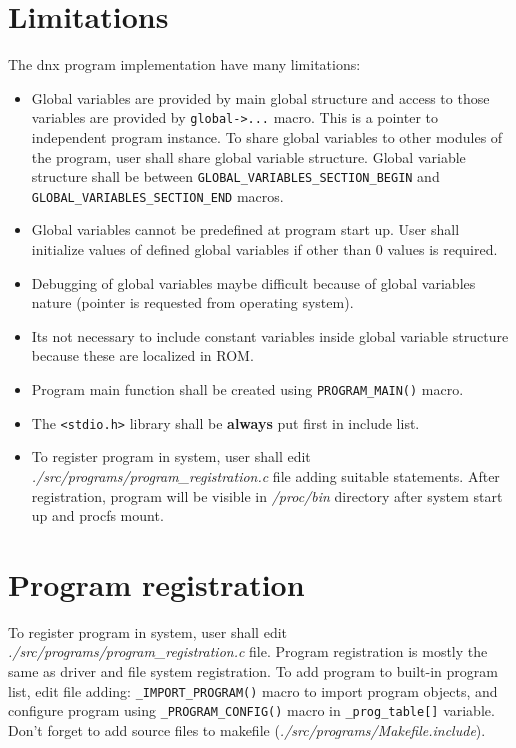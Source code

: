 \documentclass[a4paper,11pt]{report}
\renewcommand{\path}[1]{\textit{#1}}
\newcommand{\macro}[1]{\texttt{#1}}
\newcommand{\code}[1]{\texttt{#1}}
\begin{document}
\section{Limitations}
The dnx program implementation have many limitations:
\begin{itemize}
   \item Global variables are provided by main global structure and access to those variables are
         provided by \macro{global->...} macro. This is a pointer to independent program instance.
         To share global variables to other modules of the program, user shall share global variable
         structure. Global variable structure shall be between \macro{GLOBAL\_VARIABLES\_SECTION\_BEGIN}
         and \macro{GLOBAL\_VARIABLES\_SECTION\_END} macros.
   \item Global variables cannot be predefined at program start up. User shall initialize values
         of defined global variables if other than 0 values is required.
   \item Debugging of global variables maybe difficult because of global variables nature (pointer is
         requested from operating system).
   \item Its not necessary to include constant variables inside global variable structure because
         these are localized in ROM.
   \item Program main function shall be created using \macro{PROGRAM\_MAIN()} macro.
   \item The \code{<stdio.h>} library shall be \textbf{always} put first in include list.
   \item To register program in system, user shall edit \path{./src/programs/program\_registration.c}
         file adding suitable statements. After registration, program will be visible in \path{/proc/bin}
         directory after system start up and procfs mount.
\end{itemize}

\section{Program registration}
To register program in system, user shall edit \path{./src/programs/program\_registration.c} file.
Program registration is mostly the same as driver and file system registration. To add program to
built-in program list, edit file adding: \macro{\_IMPORT\_PROGRAM()} macro to import program objects,
and configure program using \macro{\_PROGRAM\_CONFIG()} macro in \code{\_prog\_table[]} variable.
Don't forget to add source files to makefile (\path{./src/programs/Makefile.include}).
\end{document}

